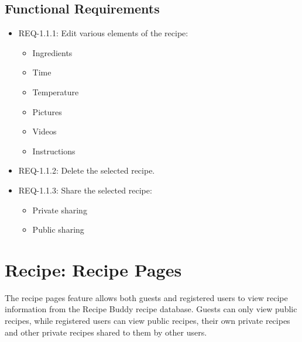 \documentclass{scrreprt}
\begin{document}
\subsection{Functional Requirements}

\begin{itemize}
    \item REQ-1.1.1: Edit various elements of the recipe:
          \begin{itemize}
              \item Ingredients
              \item Time
              \item Temperature
              \item Pictures
              \item Videos
              \item Instructions
          \end{itemize}
    \item REQ-1.1.2: Delete the selected recipe.
    \item REQ-1.1.3: Share the selected recipe:
          \begin{itemize}
              \item Private sharing
              \item Public sharing
          \end{itemize}
\end{itemize}

\section{Recipe: Recipe Pages}

The recipe pages feature allows both guests and registered users to view recipe information from the \gls{Recipe Buddy} recipe database. Guests can only view public recipes, while registered users can view public recipes, their own private recipes and other private recipes shared to them by other users.
\end{document}
